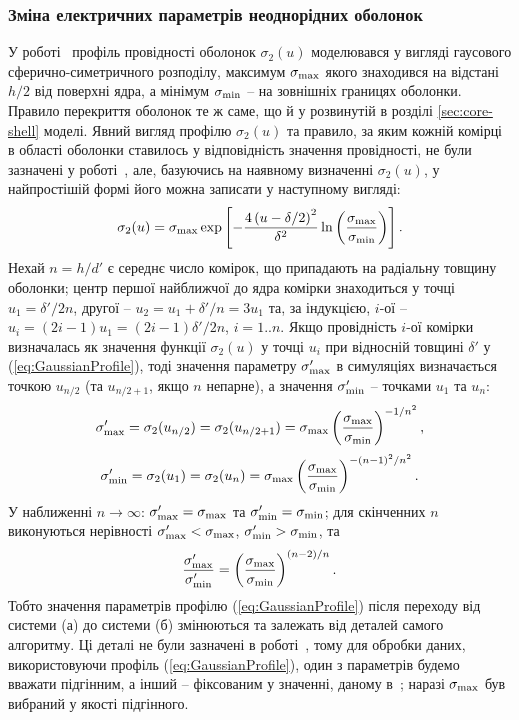 \documentclass[14pt,twoside]{vakthesis}
\begin{document}
\subsubsection{Зміна електричних параметрів неоднорідних оболонок}

У роботі~\cite{Siekierski2006} профіль провідності оболонок $\sigma_2(u)$ моделювався у вигляді гаусового сферично-симетричного розподілу, максимум $\sigma_{\rm max}$ якого знаходився на відстані $h/2$ від поверхні ядра, а мінімум $\sigma_{\rm min}$ -- на зовнішніх границях оболонки. Правило перекриття оболонок те ж саме, що й у розвинутій в розділі \ref{sec:core-shell} моделі.  Явний вигляд профілю $\sigma_2(u)$ та правило, за яким кожній комірці в області оболонки ставилось у відповідність значення провідності, не були зазначені у роботі~\cite{Siekierski2006}, але, базуючись на наявному визначенні $\sigma_2(u)$, у найпростішій формі його можна записати у наступному вигляді:
\begin{equation}\label{eq:GaussianProfile}
\sigma_2(u)=\sigma_{\rm max} \exp
\left[-\frac{4\left(u-\delta/2\right)^2}{{\delta}^2}\ln\left(\frac{\sigma_{\rm
		max}}{\sigma_{\rm min}} \right)\right].
\end{equation}
Нехай $n = h/d'$ є середнє число комірок, що припадають на радіальну 
товщину оболонки; центр першої найближчої до ядра комірки знаходиться у точці $u_1 = \delta'/2n$, другої -- $u_2 = u_1 + \delta'/n = 3u_1$ та, за індукцією, $i$-ої -- $u_i = (2i - 1)u_1 = (2i - 1)\delta'/2n$,
$i = 1..n$. Якщо провідність $i$-ої комірки визначалась як значення функції $\sigma_2(u)$ у точці $u_i$ при відносній товщині $\delta'$ у (\ref{eq:GaussianProfile}), тоді значення параметру $\sigma'_{\rm max}$ в симуляціях \cite{Siekierski2006} визначається точкою $u_{n/2}$ (та $u_{n/2+1}$, якщо $n$ непарне), а значення $\sigma'_{\rm min}$ -- точками $u_1$ та $u_n$:
$$
\sigma'_{\rm max} = \sigma_2(u_{n/2})=\sigma_2(u_{n/2+1})=
\sigma_{\rm max}\left(\frac{ \sigma_{\rm max}}{
	\sigma_{\rm min}}\right)^{-1/n^2},
$$
$$
\sigma'_{\rm min} = \sigma_2(u_{1})=\sigma_2(u_{n})=
\sigma_{\rm max}\left(\frac{ \sigma_{\rm max}}{
	\sigma_{\rm min}}\right)^{-(n-1)^2/n^2}.
$$ 
У наближенні $n \to \infty$: $\sigma'_{\rm max} = \sigma_{\rm max}$ та
$\sigma'_{\rm min} = \sigma_{\rm min}$; для скінченних $n$ виконуються нерівності
$\sigma'_{\rm max} < \sigma_{\rm max}$, $\sigma'_{\rm min}
> \sigma_{\rm min}$, та
\begin{equation}\label{eq:sigma-maxmin-rel}
\frac{\sigma'_{\rm max}}{\sigma'_{\rm min}} = \left(\frac{ \sigma_{\rm max}}{
	\sigma_{\rm min}}\right)^{(n-2)/n}.
\end{equation}
Тобто значення параметрів профілю (\ref{eq:GaussianProfile}) після переходу від системи (а) до системи (б) змінюються та залежать від деталей самого алгоритму. Ці деталі не були зазначені в роботі~\cite{Siekierski2006}, тому для обробки даних, використовуючи профіль (\ref{eq:GaussianProfile}), один з параметрів будемо вважати підгінним, а інший -- фіксованим у значенні, даному в~\cite{Siekierski2006}; наразі $\sigma_{\rm max}$ був вибраний у якості підгінного.
\end{document}

